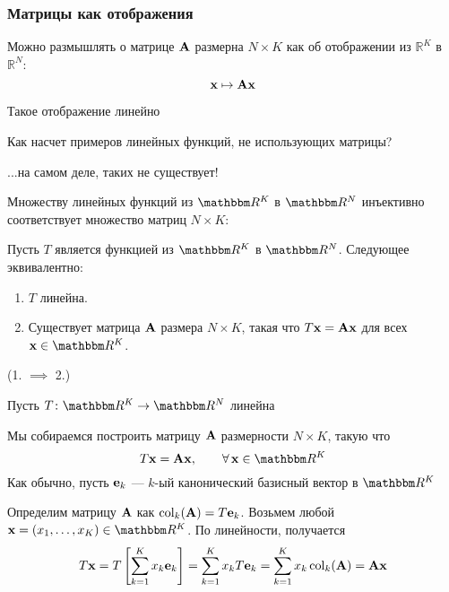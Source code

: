 \begin{frame}\frametitle{Матрицы как отображения}

    \vspace{2em}
    Можно размышлять о матрице $\mathbf A$ размерна $N\times K$ как об отображении из 	
    $\mathbb{R}^{K}$ в $\mathbb{R}^{N}$:
    \[
        {\mathbf x} \mapsto \mathbf A{\mathbf x} 
    \]
    
    Такое отображение линейно
    
    \vspace{.7em}
    Как насчет примеров линейных функций, не использующих матрицы? 
    
    ...на самом деле, таких не существует! 
    
\end{frame}

\begin{frame}
    
    \vspace{.7em}
    Множеству линейных функций из $\RR^K$ в
    $\RR^N$ инъективно соответствует множество матриц $N \times K$:
    
    \vspace{.7em}
    \Thm{\eqref{ET-t:lmaeq}}
    Пусть $T$ является функцией из $\RR^K$ в $\RR^N$. Следующее эквивалентно:
    \begin{enumerate}
        \item $T$ линейна.
        \item Существует матрица $\mathbf A$ размера $N \times K$, такая что 
        $T{\mathbf x} = \mathbf A {\mathbf x}$ для всех $\boldx \in \RR^K$.
    \end{enumerate}
\end{frame}

\begin{frame}

    \vspace{2em}
    \Prf (1. $\implies$ 2.)
    
    Пусть $T \colon \RR^K \to \RR^N$ линейна
    
    Мы собираемся построить матрицу $\mathbf A$ размерности $N \times K$, такую что
    $$ T\boldx = \boldA \boldx, \qquad \forall \, \boldx \in \RR^K $$
    Как обычно, пусть
    ${\mathbf e}_k$ --- $k$-ый канонический базисный вектор в $\RR^K$
    
    Определим матрицу $\mathbf A$ как $\operatorname{col}_k(\mathbf A) = T{\mathbf e}_k$. Возьмем любой 
    $\boldx = (x_1, \ldots, x_K) \in \RR^K$. По линейности, получается
    \begin{equation*}
        T{\mathbf x} 
        = T \left[\sum_{k=1}^K x_k {\mathbf e}_k \right]
        = \sum_{k=1}^K x_k T {\mathbf e}_k
        = \sum_{k=1}^K x_k \operatorname{col}_k(\mathbf A)
        = \mathbf A {\mathbf x}
    \end{equation*}
    
\end{frame}

